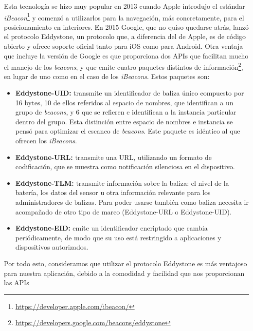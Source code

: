Esta tecnología se hizo muy popular en 2013 cuando Apple introdujo el estándar \textit{iBeacon}\footnote{\url{https://developer.apple.com/ibeacon/}} y comenzó a utilizarlos para la navegación, más concretamente, para el posicionamiento en interiores. En 2015 Google, que no quiso quedarse atrás, lanzó el protocolo Eddystone, un protocolo que, a diferencia del de Apple, es de código abierto y ofrece soporte oficial tanto para iOS como para Android. Otra ventaja que incluye la versión de Google es que proporciona dos APIs que facilitan mucho el manejo de los \textit{beacons}, y que emite cuatro paquetes distintos de información\footnote{\url{https://developers.google.com/beacons/eddystone}}, en lugar de uno como en el caso de los \textit{iBeacons}. Estos paquetes son:

\begin{itemize}
	\item \textbf{Eddystone-UID:} transmite un identificador de baliza único compuesto por 16 bytes, 10 de ellos referidos al espacio de nombres, que identifican a un grupo de \textit{beacons}, y 6 que se refieren e identifican a la instancia particular dentro del grupo. Esta distinción entre espacio de nombres e instancia se pensó para optimizar el escaneo de \textit{beacons}. Este paquete es idéntico al que ofrecen los \textit{iBeacons}.
	
	\item \textbf{Eddystone-URL:} transmite una URL, utilizando un formato de codificación, que se muestra como notificación silenciosa en el dispositivo.
	
	\item \textbf{Eddystone-TLM:} transmite información sobre la baliza: el nivel de la batería, los datos del sensor u otra información relevante para los administradores de balizas. Para poder usarse también como baliza necesita ir acompañado de otro tipo de marco (Eddystone-URL o Eddystone-UID).
	
	\item \textbf{Eddystone-EID:} emite un identificador encriptado que cambia periódicamente, de modo que su uso está restringido a aplicaciones y dispositivos autorizados.
\end{itemize}

Por todo esto, consideramos que utilizar el protocolo Eddystone es más ventajoso para nuestra aplicación, debido a la comodidad y facilidad que nos proporcionan las APIs 


